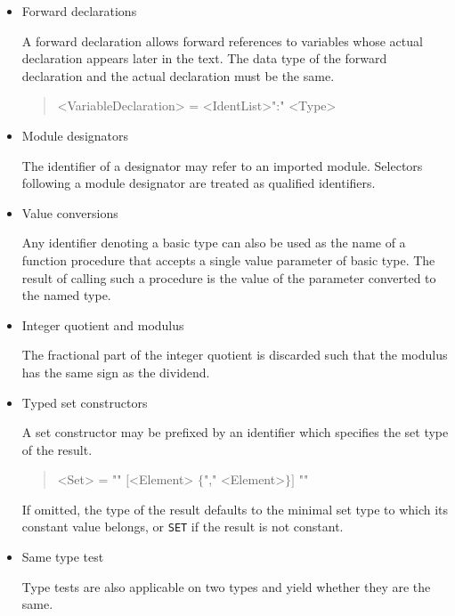 
\begin{itemize}

\item Forward declarations

A forward declaration allows forward references to variables whose actual declaration appears later in the text.
The data type of the forward declaration and the actual declaration must be the same.

\begin{quote}\begin{grammar}
<VariableDeclaration> = \changed{$[$\lit*{\^}$]$} <IdentList>":" <Type> \par
\end{grammar}\end{quote}

\end{itemize}


\begin{itemize}

\item Module designators

The identifier of a designator may refer to an imported module.
Selectors following a module designator are treated as qualified identifiers.

\item Value conversions

Any identifier denoting a basic type can also be used as the name of a function procedure that accepts a single value parameter of basic type.
The result of calling such a procedure is the value of the parameter converted to the named type.

\item Integer quotient and modulus

The fractional part of the integer quotient is discarded such that the modulus has the same sign as the dividend.

\item Typed set constructors

A set constructor may be prefixed by an identifier which specifies the set type of the result.

\begin{quote}\begin{grammar}
<Set> =  "{" $[$<Element> $\{$"," <Element>$\}]$ "}"
\end{grammar}\end{quote}

If omitted, the type of the result defaults to the minimal set type to which its constant value belongs, or \texttt{SET} if the result is not constant.

\item Same type test

Type tests are also applicable on two types and yield whether they are the same.

\end{itemize}

